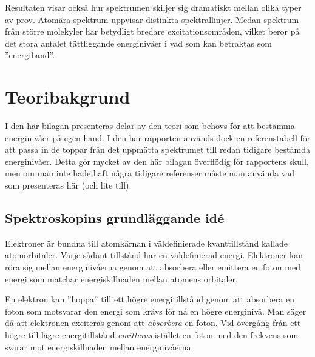 \documentclass[11pt,a4paper]{article}
\begin{document}
Resultaten visar också hur
spektrumen skiljer sig dramatiskt mellan olika typer av prov. Atomära
spektrum uppvisar distinkta spektrallinjer. Medan spektrum från större
molekyler har betydligt bredare excitationsområden, vilket beror på
det stora antalet tättliggande energinivåer i vad som kan betraktas
som ''energiband''. 




\newpage
{}




\clearpage
\appendix
\setcounter{page}{1}
\renewcommand*{\thepage}{A\arabic{page}}




\section{Teoribakgrund} \label{sec:teori}
I den här bilagan presenteras delar av den teori som behövs för att
bestämma energinivåer på egen hand. I den här rapporten används dock
en referenstabell för att passa in de toppar från det uppmätta
spektrumet till redan tidigare bestämda energinivåer. Detta gör mycket
av den här bilagan överflödig för rapportens skull, men om man inte
hade haft några tidigare referenser måste man använda vad som
presenteras här (och lite till).

\subsection{Spektroskopins grundläggande idé}
Elektroner är bundna till atomkärnan i väldefinierade kvanttillstånd
kallade atomorbitaler. Varje sådant tillstånd har en väldefinierad
energi. Elektroner kan röra sig mellan energinivåerna genom att
absorbera eller emittera en foton med energi som matchar 
energiskillnaden mellan atomens orbitaler. 

En elektron kan ''hoppa'' till ett högre energitillstånd genom att
absorbera en foton som motsvarar den energi som krävs för nå en högre
energinivå. Man säger då att elektronen exciteras genom att
\emph{absorbera} en foton. Vid övergång från ett högre till lägre
energitillstånd \emph{emitteras} istället en foton med den frekvens
som svarar mot energiskillnaden mellan energinivåerna. 
 
\end{document}
